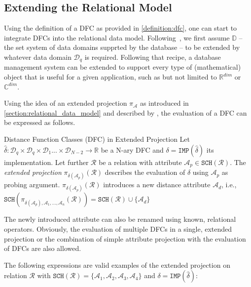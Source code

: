 \subsection{Extending the Relational Model}

Using the definition of a DFC as provided in \cref{definition:dfc}, one can start to integrate DFCs into the relational data model. Following~\cite{Giangreco:2018thesis}, we first assume  $\mathbb{D}$ -- the set system of data domains supprted by the database -- to be extended by whatever data domain $\mathcal{D}_q$ is required. Following that recipe, a database management system can be extended to support every type of (mathematical) object that is useful for a given application, such as but not limited to $\mathbb{R}^{dim}$ or $\mathbb{C}^{dim}$. 

Using the idea of an extended projection $\pi_{\mathcal{A}}$ as introduced in \cref{section:relational_data_model} and described by \cite{Garcia:2009Database}, the evaluation of a DFC can be expressed as follows.

\begin{definition}[label=definition:spf_rel]{Distance Function Classes (DFC) in Extended Projection}{}
    Let $\hat{\delta} \colon \mathcal{D}_q \times \mathcal{D}_q \times \mathcal{D}_{1} ... \times \mathcal{D}_{N-2} \to \mathbb{R}$ be a N-ary DFC and $\delta = \mathtt{IMP}(\hat{\delta})$ its implementation. Let further $\mathcal{R}$ be a relation with attribute $\mathcal{A}_p \in \mathtt{SCH}(\mathcal{R})$. The \emph{extended projection} $\pi_{\delta(\mathcal{A}_p)}(\mathcal{R})$ describes the evaluation of $\delta$ using $\mathcal{A}_p$ as probing argument. $\pi_{\delta(\mathcal{A}_p)}(\mathcal{R})$ introduces a new distance attribute $\mathcal{A}_d$, i.e., $\mathtt{SCH}(\pi_{\delta(\mathcal{A}_p), \mathcal{A}_1, ..., \mathcal{A}_n}(\mathcal{R})) = \mathtt{SCH}(\mathcal{R}) \cup \{ \mathcal{A}_d \}$
\end{definition}

The newly introduced attribute can also be renamed using known, relational operators. Obviously, the evaluation of multiple DFCs in a single, extended projection or the combination of simple attribute projection with the evaluation of DFCs are also allowed. 

The following expressions are valid examples of the extended projection on relation $\mathcal{R}$ with $\mathtt{SCH}(\mathcal{R}) = \{ \mathcal{A}_1, \mathcal{A}_2, \mathcal{A}_3, \mathcal{A}_4 \}$ and $\delta = \mathtt{IMP}(\hat{\delta})$: 

